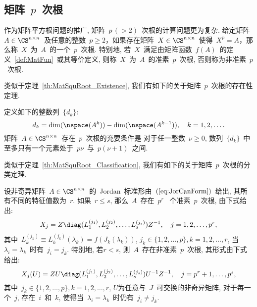 


\subsection{矩阵~$p$~次根}

作为矩阵平方根问题的推广, 矩阵~$p\,(>2)$~次根的计算问题更为复杂.
给定矩阵~$A \in \CS^{n\times n}$~及任意的整数~$p \geq
2$，如果存在矩阵~$X \in \CS^{n \times n}$~使得~$X^p =
A$，那么称~$X$~为~$A$~的一个~$p$~次根. 特别地,
若~$X$~满足由矩阵函数~$f(A)$~的定义~\ref{def:MatFun}~或其等价定义,
则称~$X$~为~$A$~的准素~$p$~次根, 否则称为非准素~$p$~次根.



类似于定理~\ref{th:MatSquRoot_Existence},
我们有如下的关于矩阵~$p$~次根的存在性定理.

\begin{theorem}
\label{th:MatpthRoor_existence} 定义如下的整数列~$\{d_k\}$:
$$
d_k = \dim(\nspace(A^k)) - \dim(\nspace(A^{k-1})),\quad
k=1,2,\ldots.
$$
矩阵~$A\in\CS^{n\times n}$~存在~$p$~次根的充要条件是
对于任一整数~$\nu\geq0$,
数列~$\{d_k\}$~中至多只有一个元素处于~$p\nu$~与~$p(\nu+1)$~之间.
\end{theorem}

类似于定理~\ref{th:MatSquRoot_Classification},
我们有如下的关于矩阵~$p$~次根的分类定理.

\begin{theorem}
设非奇异矩阵~$A\in\CS^{n\times
n}$~的~Jordan~标准形由~$(\ref{eq:JorCanForm})$~给出,
其所有不同的特征值数为~$r$.  如果~$r\leq s$, 那么~$A$~存在~$p^r$~
个准素~$p$~次根, 由下式给出:
$$
X_j = Z \diag(L_1^{(j_1)},L_2^{(j_2)}, \ldots,
L_s^{(j_s)})Z^{-1},\quad j = 1,2,\ldots, p^r,
$$
其中~$L_k^{(j_k)} \equiv L_k^{(j_k)}(\lambda_k) =
f(J_k(\lambda_k))$, $j_k \in \{1,2,\ldots,p\}, k=1,2,\ldots,r$,
当~$\lambda_i = \lambda_k$~时有~$j_i = j_k$. 特别地, 若$r < s$,
则~$A$~存在非准素~$p$~次根, 其形式由下式给出:
$$
X_j(U) = ZU\diag(L_1^{(j_1)},L_2^{(j_2)}, \ldots,
L_s^{(j_s)})U^{-1}Z^{-1}, \quad j = p^r+1, \ldots, p^s,
$$
其中~$j_k \in \{1,2,\ldots,p\}, k=1,2,\ldots,r$,
$U$为任意与~$J$~可交换的非奇异矩阵, 对于每一个~$j$, 存在~$i$~和~$k$,
使得当~$\lambda_i = \lambda_k$~时仍有~$j_i \neq j_k$.
\end{theorem}


